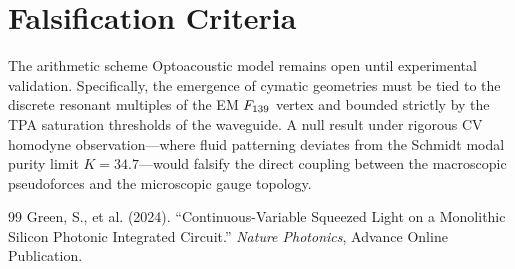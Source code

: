 \section{Falsification Criteria}
The arithmetic scheme Optoacoustic model remains open until experimental validation. Specifically, the emergence of cymatic geometries must be tied to the discrete resonant multiples of the EM $F_{139}$ vertex and bounded strictly by the TPA saturation thresholds of the waveguide. A null result under rigorous CV homodyne observation---where fluid patterning deviates from the Schmidt modal purity limit $K=34.7$---would falsify the direct coupling between the macroscopic pseudoforces and the microscopic gauge topology.

\vspace{2em}
\begin{thebibliography}{99}
Green, S., et al. (2024).
``Continuous-Variable Squeezed Light on a Monolithic Silicon Photonic Integrated Circuit.''
\textit{Nature Photonics}, Advance Online Publication.

\end{thebibliography}
